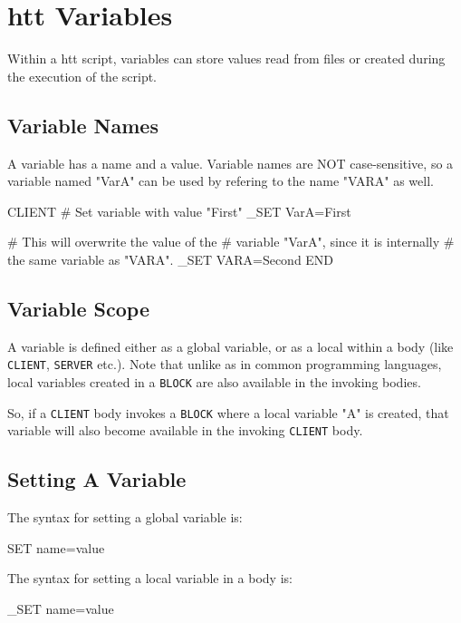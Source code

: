 \chapter{htt Variables}
\label{chap:variables}

Within a htt script, variables can store values read from files 
or created during the execution of the script.

\section{Variable Names}

A variable has a name and a value. Variable names are NOT 
case-sensitive, so a variable named "VarA" can be used by 
refering to the name "VARA" as well.

\begin{usplisting}
    CLIENT
    # Set variable with value "First"
    _SET VarA=First
    
    # This will overwrite the value of the 
    # variable "VarA", since it is internally 
    # the same variable as "VARA".
    _SET VARA=Second
    END
\end{usplisting}

\section{Variable Scope}

A variable is defined either as a global variable, or as a local within 
a body (like \texttt{CLIENT}, \texttt{SERVER} etc.). Note that unlike as in  
common programming languages, local variables created in a \texttt{BLOCK} 
are also available in the invoking bodies.

So, if a \texttt{CLIENT} body invokes a \texttt{BLOCK} where a local variable "A" 
is created, that variable will also become available in the invoking \texttt{CLIENT} 
body.

\newpage
\section{Setting A Variable} 

The syntax for setting a global variable is:

\begin{usplisting}
    SET name=value
\end{usplisting}

The syntax for setting a local variable in a body is:

\begin{usplisting}
    _SET name=value
\end{usplisting}

